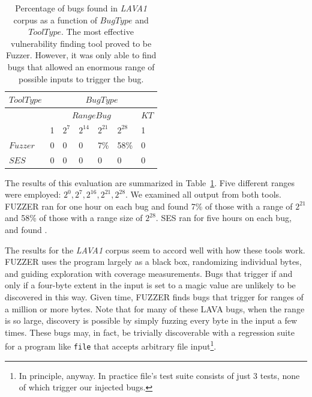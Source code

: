 \begin{table}[h]
\centering
\begin{tabular}{l|l|l|l|l|l|l} 
$Tool Type$ &                     \multicolumn{6}{|c}{$Bug Type$}                           \\  \hline  
            &                     \multicolumn{5}{|c|}{$Range Bug$}               & $KT$    \\   
            &    1       & $2^7$       & $2^{14}$     & $2^{21}$   & $2^{28}$     & 1   \\  \hline 
$Fuzzer$    &    0       & 0           & 0            & 7\%        & 58\%         & 0         \\
$SES$       &    0       & 0           & 0            & 0          & 0            & 0         \\
\end{tabular}
\caption{Percentage of bugs found in \emph{LAVA1} corpus as a function of $Bug Type$ and $Tool Type$.  
The most effective vulnerability finding tool proved to be Fuzzer.  
However, it was only able to find bugs that allowed an enormous range of possible inputs to trigger the bug.}
\label{table:eval1-file}
\end{table}

The results of this evaluation are summarized in Table~\ref{table:eval1-file}.
Five different ranges were employed: $2^0, 2^7, 2^{16}, 2^{21}, 2^{28}$. 
We examined all output from both tools.  
FUZZER ran for one hour on each bug and found 7\% of those with a range of $2^{21}$ and 58\% of those with a range size of $2^{28}$.
SES ran for five hours on each bug, and found .

The results for the \emph{LAVA1} corpus seem to accord well with how these tools work.
FUZZER uses the program largely as a black box, randomizing individual bytes, and guiding exploration with coverage measurements.
Bugs that trigger if and only if a four-byte extent in the input is set to a magic value are unlikely to be discovered in this way.
Given time, FUZZER finds bugs that trigger for ranges of a million or more bytes. 
Note that for many of these LAVA bugs, when the range is so large, discovery is possible by simply fuzzing every byte in the input a few times.  
These bugs may, in fact, be trivially discoverable with a regression suite for a program like \verb+file+ that accepts arbitrary file input\footnote{In principle, anyway. In practice file's test suite consists of just 3 tests, none of which trigger our injected bugs.}.

